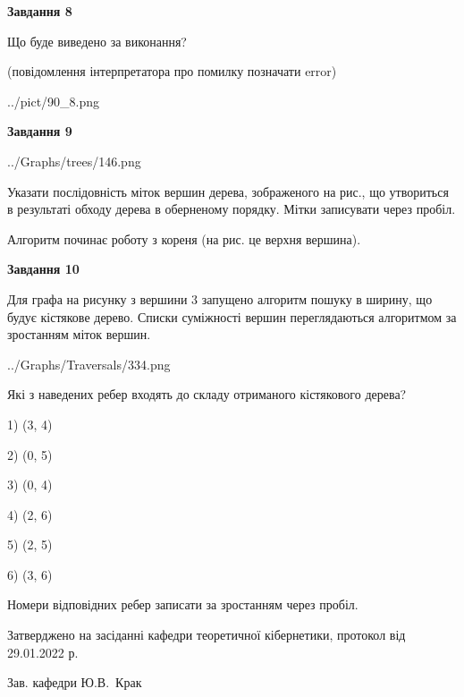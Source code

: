 \documentclass[12pt, ukrainian]{article}
\begin{document}
{\begin {large}
{\begin {center}\textbf{Завдання 8}\end {center}}\par
Що буде виведено за виконання?\par
 (повідомлення інтерпретатора про помилку позначати error)\par
\begin{center}
	{../pict/90_8.png}
\end{center}
\newpage

{\begin {center}\textbf{Завдання 9}\end {center}}\par

\begin{center}
	{../Graphs/trees/146.png}
\end{center}
Указати послідовність міток вершин дерева, зображеного на рис., що утвориться в результаті обходу дерева в оберненому порядку. Мітки записувати через пробіл.\par Алгоритм починає роботу з кореня (на рис. це верхня вершина).\par
\newpage

{\begin {center}\textbf{Завдання 10}\end {center}}\par
Для графа на рисунку з вершини 3 запущено алгоритм пошуку в ширину, що будує кістякове дерево. Списки суміжності вершин переглядаються алгоритмом за зростанням міток вершин.\par
\begin{center}
	{../Graphs/Traversals/334.png}
\end{center}
\par Які з наведених ребер входять до складу отриманого кістякового дерева?\par
1) (3, 4)\par
2) (0, 5)\par
3) (0, 4)\par
4) (2, 6)\par
5) (2, 5)\par
6) (3, 6)\par
{\vskip 15pt} Номери відповідних ребер записати за зростанням через пробіл.\par
\newpage


\end {large}
}
{\smallskip \begin {small} Затверджено на засіданні кафедри теоретичної кібернетики, протокол  від   29.01.2022 р.\par\smallskip\smallskip
{\parbox {6.5 cm}{Зав. кафедри \dotfill Ю.В.~Крак}} \end{small}}
\end{document}
